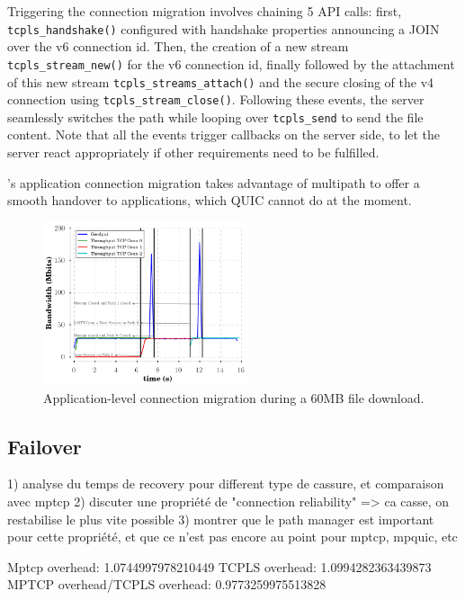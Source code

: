 Triggering the connection migration involves chaining 5 API calls:
first, \texttt{tcpls\_handshake()} configured with handshake properties announcing a JOIN over the v6 connection id. Then, the creation of a new stream
\texttt{tcpls\_stream\_new()} for the v6 connection id, finally followed by the attachment of this new stream \texttt{tcpls\_streams\_attach()} and the secure closing of the v4 \tcp connection using \texttt{tcpls\_stream\_close()}. Following these events, the server seamlessly switches the path while looping over \texttt{tcpls\_send} to send the file content. Note that all the events trigger callbacks on the server side, to let the server react appropriately if other requirements need to be fulfilled.

\tcpls's application connection migration takes advantage of multipath to offer
a smooth handover to applications, which QUIC cannot do at the moment.

\begin{figure}[!t]
  \centering
  \includegraphics[width=6cm]{figures/migration.png}
  \caption{Application-level connection migration during a 60MB file download.}
  \label{fig:conn_migration}
\end{figure}

\subsection{Failover}

1) analyse du temps de recovery pour different type de cassure, et comparaison avec mptcp
2) discuter une propriété de "connection reliability" => ca casse, on restabilise le plus vite possible
3) montrer que le path manager est important pour cette propriété, et que ce n'est pas encore au point pour mptcp, mpquic, etc

Mptcp overhead: 1.0744997978210449
TCPLS overhead: 1.0994282363439873
MPTCP overhead/TCPLS overhead:              0.9773259975513828


